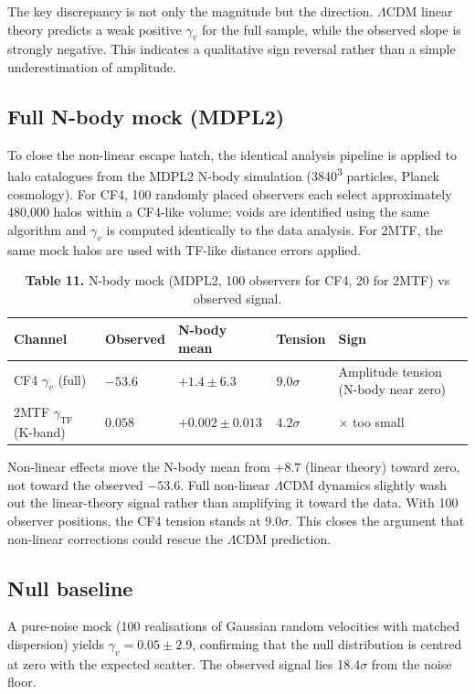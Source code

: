 \documentclass[11pt,a4paper]{article}
\begin{document}
The key discrepancy is not only the magnitude but the direction. \(\Lambda\)CDM linear theory predicts a weak positive \(\gamma_v\) for the full sample, while the observed slope is strongly negative. This indicates a qualitative sign reversal rather than a simple underestimation of amplitude.

\subsection{Full N-body mock (MDPL2)}
To close the non-linear escape hatch, the identical analysis pipeline is applied to halo catalogues from the MDPL2 N-body simulation (3840\textsuperscript{3} particles, Planck cosmology). For CF4, 100 randomly placed observers each select approximately 480,000 halos within a CF4-like volume; voids are identified using the same algorithm and \(\gamma_v\) is computed identically to the data analysis. For 2MTF, the same mock halos are used with TF-like distance errors applied.

\begin{table}[H]
\centering
\footnotesize
\caption{\textbf{Table 11.} N-body mock (MDPL2, 100 observers for CF4, 20 for 2MTF) vs observed signal.}
\begin{tabularx}{\linewidth}{l>{\RaggedRight\arraybackslash}X>{\RaggedRight\arraybackslash}X>{\RaggedRight\arraybackslash}X>{\RaggedRight\arraybackslash}X}
\toprule
\textbf{Channel} & \textbf{Observed} & \textbf{N-body mean} & \textbf{Tension} & \textbf{Sign} \tabularnewline
\midrule
CF4 \(\gamma_v\) (full) & \(-53.6\) & \(+1.4 \pm 6.3\) & \(9.0\sigma\) & Amplitude tension (N-body near zero) \tabularnewline
2MTF \(\gamma_\mathrm{TF}\) (K-band) & \(0.058\) & \(+0.002 \pm 0.013\) & \(4.2\sigma\) & 30$\times$ too small \tabularnewline
\bottomrule
\end{tabularx}
\end{table}

Non-linear effects move the N-body mean from \(+8.7\) (linear theory) toward zero, not toward the observed \(-53.6\). Full non-linear \(\Lambda\)CDM dynamics slightly wash out the linear-theory signal rather than amplifying it toward the data. With 100 observer positions, the CF4 tension stands at \(9.0\sigma\). This closes the argument that non-linear corrections could rescue the \(\Lambda\)CDM prediction.

\subsection{Null baseline}
A pure-noise mock (100 realisations of Gaussian random velocities with matched dispersion) yields \(\gamma_v = 0.05 \pm 2.9\), confirming that the null distribution is centred at zero with the expected scatter. The observed signal lies 18.4\(\sigma\) from the noise floor.
\end{document}
